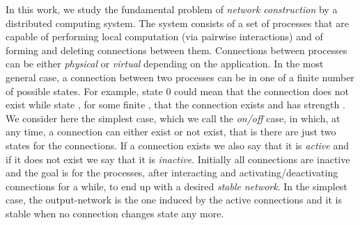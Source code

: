 \documentclass[oribibl, 11pt]{llncs}
\begin{document}
In this work, we study the fundamental problem of \emph{network construction} by a distributed computing system. The system consists of a set of processes that are capable of performing local computation (via pairwise interactions) and of forming and deleting connections between them. Connections between processes can be either \emph{physical} or \emph{virtual} depending on the application. In the most general case, a connection between two processes can be in one of a finite number of possible states. For example, state 0 could mean that the connection does not exist while state , for some finite , that the connection exists and has strength . We consider here the simplest case, which we call the \emph{on/off} case, in which, at any time, a connection can either exist or not exist, that is there are just two states for the connections. If a connection exists we also say that it is \emph{active} and if it does not exist we say that it is \emph{inactive}. Initially all connections are inactive and the goal is for the processes, after interacting and activating/deactivating connections for a while, to end up with a desired \emph{stable network}. In the simplest case, the output-network is the one induced by the active connections and it is stable when no connection changes state any more.
\end{document}
